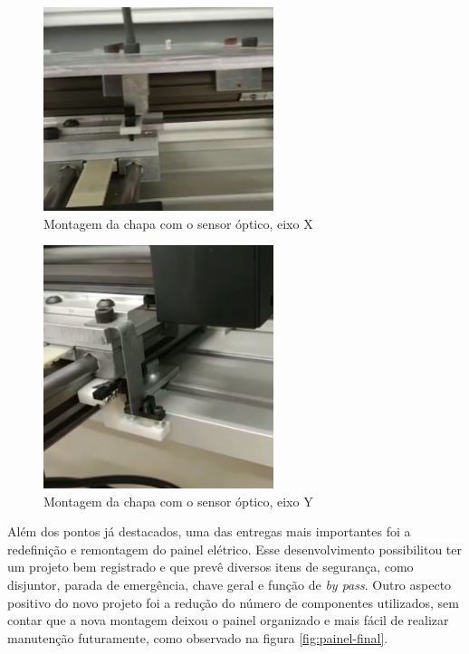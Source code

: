 \documentclass[
	article,			%
	11pt,				%
	oneside,			%
	a4paper,			%
	section=TITLE,		%
	english,			%
	brazil,				%
	sumario=tradicional
	]{abntex2}
\begin{document}
\begin{figure}[H]
    \centering
    \includegraphics[width=0.6\textwidth]{img/chapa-sensor-1.png}
    \caption{Montagem da chapa com o sensor óptico, eixo X}
    \label{fig:chapa-sensor-1}
\end{figure}

\begin{figure}[H]
    \centering
    \includegraphics[width=0.6\textwidth]{img/chapa-sensor-2.png}
    \caption{Montagem da chapa com o sensor óptico, eixo Y}
    \label{fig:chapa-sensor-2}
\end{figure}

Além dos pontos já destacados, uma das entregas mais importantes foi a redefinição e remontagem do painel elétrico. Esse desenvolvimento possibilitou ter um projeto bem registrado e que prevê diversos itens de segurança, como disjuntor, parada de emergência, chave geral e função de \textit{by pass}. Outro aspecto positivo do novo projeto foi a redução do número de componentes utilizados, sem contar que a nova montagem deixou o painel organizado e mais fácil de realizar manutenção futuramente, como observado na figura \ref{fig:painel-final}.
\end{document}
